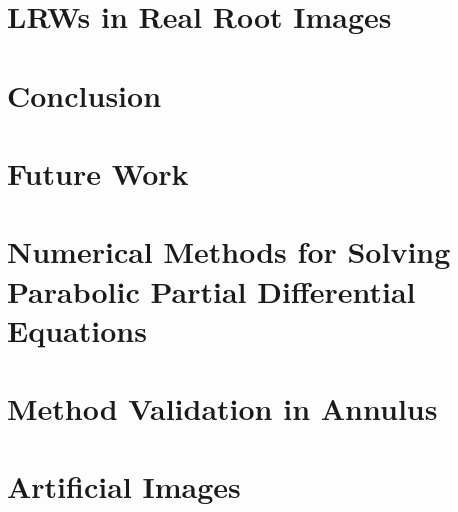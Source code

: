 \documentclass{uofsthesis-cs}
\begin{document}
  

  
  
  
  
  
  



  
  
\chapter{LRWs in Real Root Images}

 

\chapter{Conclusion}
  


  
\chapter{Future Work}

 







  \uofsappendix %

  \begin{appendices}
    
    \chapter{Numerical Methods for Solving Parabolic Partial Differential Equations}
      

    \chapter{Method Validation in Annulus}
      

    \chapter{Artificial Images}
      

    
  \end{appendices}
  
  



\end{document}

